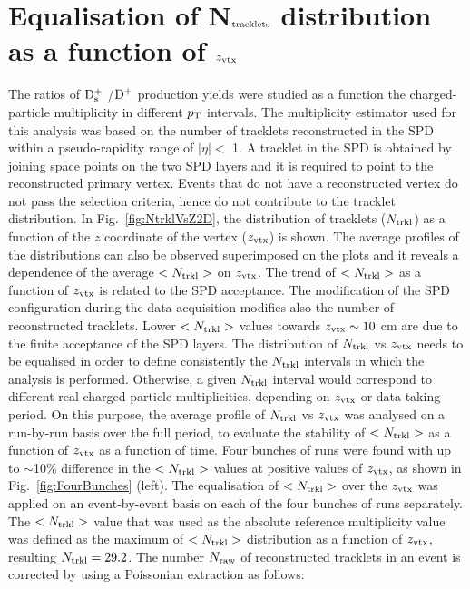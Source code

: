 \section{Equalisation of N$_{\rm tracklets}$ distribution as a function of $z_{\rm vtx}$}
\label{sec:zVxtEq}
The ratios of ${\rm D_s^+}$ /${\rm D^+}$ production yields were studied as a 
function the charged-particle multiplicity in different $p_{\rm T}$ intervals.
The multiplicity estimator used for this analysis was based on the number 
of tracklets reconstructed in the SPD within a 
pseudo-rapidity range of $|\eta| <$ 1. A tracklet in the SPD is obtained by
joining space points on the two SPD layers and it is required to point to 
the reconstructed primary vertex. 
Events that do not have a reconstructed vertex do not pass the selection criteria, hence
do not contribute to the tracklet distribution. 
In Fig.~\ref{fig:NtrklVsZ2D}, the distribution of tracklets ($N_{\rm trkl}$) as a function
of the $z$ coordinate of the vertex ($z_{\rm vtx}$) is shown.
 The average profiles of the distributions can also be observed superimposed on the plots
 and it reveals a dependence of the average $<N_{\rm trkl}>$ on $z_{\rm vtx}$. 
 The trend of $<N_{\rm trkl}>$ as a function of $z_{\rm vtx}$ is related to the SPD acceptance.
 The modification of the SPD configuration during the data acquisition 
 modifies also the number of reconstructed tracklets.
 Lower $<N_{\rm trkl}>$ values towards $z_{\rm vtx} \sim 10 $ cm are due to the 
 finite acceptance of the SPD layers. 
The distribution of $N_{\rm trkl}$ vs $z_{\rm vtx}$ needs to be equalised 
in order to define consistently the $N_{\rm trkl}$ intervals in which the analysis is performed.
Otherwise, a given $N_{\rm trkl}$ interval would correspond to different real charged particle
multiplicities, depending on $z_{\rm vtx}$ or data taking period.
On this purpose, the average profile of $N_{\rm trkl}$ vs $z_{\rm vtx}$ was analysed on a run-by-run basis 
over the full period, to evaluate the stability of $<N_{\rm trkl}>$ as a function of $z_{\rm vtx}$ 
as a function of time. Four bunches of runs were found with 
up to $\sim$10\% difference in the $<N_{\rm trkl}>$ values at positive values 
of $z_{\rm vtx}$, as shown in Fig.~\ref{fig:FourBunches} (left).
 The equalisation of $<N_{\rm trkl}>$ over the $z_{\rm vtx}$ was applied on an 
 event-by-event basis on each of the four bunches of runs separately.
The $<N_{\rm trkl}>$ value that was used as the absolute reference multiplicity 
value was defined as the maximum of $<N_{\rm trkl}>$ distribution as a function of $z_{\rm vtx}$,
resulting $N_{\rm trkl} =  29.2$. 
The number $N_{\rm raw}$ of reconstructed tracklets in an event
is corrected by using a Poissonian extraction as follows:
